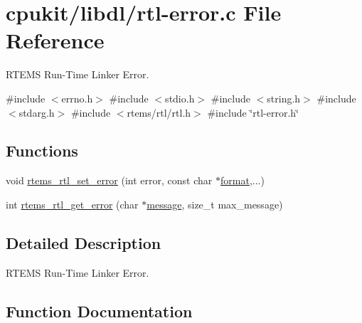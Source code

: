 \hypertarget{rtl-error_8c}{}\section{cpukit/libdl/rtl-\/error.c File Reference}
\label{rtl-error_8c}


R\+T\+E\+MS Run-\/\+Time Linker Error.  


{\ttfamily \#include $<$errno.\+h$>$}\newline
{\ttfamily \#include $<$stdio.\+h$>$}\newline
{\ttfamily \#include $<$string.\+h$>$}\newline
{\ttfamily \#include $<$stdarg.\+h$>$}\newline
{\ttfamily \#include $<$rtems/rtl/rtl.\+h$>$}\newline
{\ttfamily \#include \char`\"{}rtl-\/error.\+h\char`\"{}}\newline
\subsection*{Functions}
\begin{DoxyCompactItemize}
\item 
void \mbox{\hyperlink{rtl-error_8c_a1dd0c70dd33466d399f081dec008cc76}{rtems\+\_\+rtl\+\_\+set\+\_\+error}} (int error, const char $\ast$\mbox{\hyperlink{structformat}{format}},...)
\item 
int \mbox{\hyperlink{rtl-error_8c_a55571de1835de47afe6e44ebaaa445a0}{rtems\+\_\+rtl\+\_\+get\+\_\+error}} (char $\ast$\mbox{\hyperlink{structmessage}{message}}, size\+\_\+t max\+\_\+message)
\end{DoxyCompactItemize}


\subsection{Detailed Description}
R\+T\+E\+MS Run-\/\+Time Linker Error. 



\subsection{Function Documentation}
\mbox{\label{rtl-error_8c_a55571de1835de47afe6e44ebaaa445a0}} 
